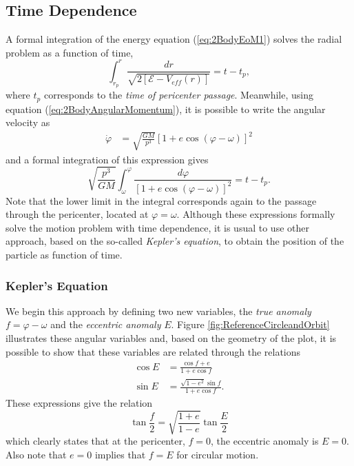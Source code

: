 \subsection{Time Dependence}\label{sec:TimeDependenceCM}
A formal integration of the energy equation (\ref{eq:2BodyEoM1}) solves the radial problem as a function of time,
\begin{equation}
\int_{r_p}^r \frac{dr}{\sqrt{2[\mathcal{E} - V_{eff} (r)]}} = t - t_p,
\end{equation}
where $t_p$ corresponds to the \textit{time of pericenter passage}. Meanwhile, using equation (\ref{eq:2BodyAngularMomentum}), it is possible to write the angular velocity as
 \begin{align}
\dot{\varphi} &= \sqrt{\frac{GM}{p^3}} \left[ 1+ e \cos (\varphi - \omega) \right]^2 \label{eq:2BodyAngularVelocity}
\end{align}
and a formal integration of this expression gives
\begin{equation}
\sqrt{\frac{p^3}{GM}} \int_\omega ^\varphi \frac{d\varphi}{\left[ 1+ e\cos (\varphi - \omega) \right]^2} =  t-t_p .
\end{equation}
Note that the lower limit in the integral corresponds again to the passage through the pericenter, located at $\varphi = \omega$. Although these expressions formally solve the motion problem with time dependence, it is usual to use other approach, based on the so-called \textit{Kepler's equation}, to obtain the position of the particle as function of time. 

\subsubsection{Kepler's Equation}

We begin this approach by defining two new variables, the \textit{true anomaly} $f = \varphi - \omega$ and the \textit{eccentric anomaly} $E$. Figure \ref{fig:ReferenceCircleandOrbit} illustrates these angular variables and, based on the geometry of the plot, it is possible to show that these variables are related through the relations
 \begin{subequations}\label{eq:2BodyEandfRelations1}
 \begin{align}
 \cos E &= \frac{\cos f + e}{1+ e \cos f}\\
 \sin E &= \frac{\sqrt{1-e^2} \sin f}{1+e \cos f}.
 \end{align}
 \end{subequations}
These expressions give the relation
 \begin{equation}
 \tan \frac{f}{2} = \sqrt{\frac{1+e}{1-e}} \tan \frac{E}{2} \label{eq:2BodyfandErelation}
 \end{equation}
 which clearly states that at the pericenter, $f=0$, the eccentric anomaly is $E=0$. Also note that $e=0$ implies that $f=E$ for circular motion.
 


